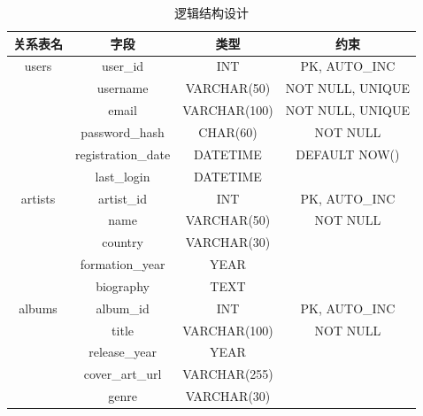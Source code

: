 \documentclass{base}
\numberwithin{figure}{section} %
\begin{document}
\begin{longtable}{@{}cccc@{}}
\caption{逻辑结构设计}
\label{tab:my-table}\\
\toprule
\textbf{关系表名}   & \textbf{字段}        & \textbf{类型}  & \textbf{约束}                     \\* \midrule
\endhead
%
\bottomrule
\endfoot
%
\endlastfoot
%
users           & user\_id           & INT          & PK, AUTO\_INC                   \\
                & username           & VARCHAR(50)  & NOT NULL, UNIQUE                \\
                & email              & VARCHAR(100) & NOT NULL, UNIQUE                \\
                & password\_hash     & CHAR(60)     & NOT NULL                        \\
                & registration\_date & DATETIME     & DEFAULT NOW()                   \\
                & last\_login        & DATETIME     &                                 \\
artists         & artist\_id         & INT          & PK, AUTO\_INC                   \\
                & name               & VARCHAR(50)  & NOT NULL                        \\
                & country            & VARCHAR(30)  &                                 \\
                & formation\_year    & YEAR         &                                 \\
                & biography          & TEXT         &                                 \\
albums          & album\_id          & INT          & PK, AUTO\_INC                   \\
                & title              & VARCHAR(100) & NOT NULL                        \\
                & release\_year      & YEAR         &                                 \\
                & cover\_art\_url    & VARCHAR(255) &                                 \\
                & genre              & VARCHAR(30)  &                                 \\

\end{longtable}
\end{document}
